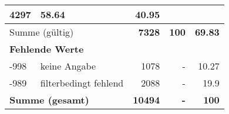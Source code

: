 \begin{longtable}{lXrrr}
       \num{4297} &
       \num[round-mode=places,round-precision=2]{58,64} &
         \num[round-mode=places,round-precision=2]{40,95} \\
     \midrule
     \multicolumn{2}{l}{Summe (gültig)} &
       \textbf{\num{7328}} &
     \textbf{100} &
       \textbf{\num[round-mode=places,round-precision=2]{69,83}} \\
     \multicolumn{5}{l}{\textbf{Fehlende Werte}}\\
       -998 &
       keine Angabe &
         \num{1078} &
        - &
         \num[round-mode=places,round-precision=2]{10,27} \\
       -989 &
       filterbedingt fehlend &
         \num{2088} &
        - &
         \num[round-mode=places,round-precision=2]{19,9} \\
     \midrule
     \multicolumn{2}{l}{\textbf{Summe (gesamt)}} &
          \textbf{\num{10494}} &
        \textbf{-} &
        \textbf{100} \\
     \bottomrule
     \end{longtable}
     
